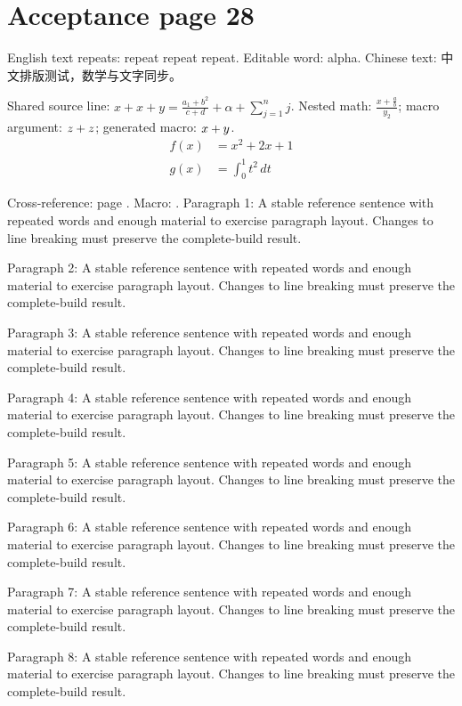 \section*{Acceptance page 28}
\label{page:28}
English text repeats: repeat repeat repeat. Editable word: alpha.
Chinese text: 中文排版测试，数学与文字同步。\par
Shared source line: $x+x+y=\frac{a_{1}+b^{2}}{c+d}+\alpha+\sum_{j=1}^{n}j$.
Nested math: $\frac{x+\frac{a}{b}}{y_{2}}$; macro argument: $z+z$; generated macro: $x+y$.
\begin{align*}
 f(x)&=x^{2}+2x+1\\
 g(x)&=\int_{0}^{1} t^{2}\,dt
\end{align*}
\par Cross-reference: page \pageref{page:1}. Macro: \globalword.
Paragraph 1: A stable reference sentence with repeated words and enough material to exercise paragraph layout. Changes to line breaking must preserve the complete-build result.\par
Paragraph 2: A stable reference sentence with repeated words and enough material to exercise paragraph layout. Changes to line breaking must preserve the complete-build result.\par
Paragraph 3: A stable reference sentence with repeated words and enough material to exercise paragraph layout. Changes to line breaking must preserve the complete-build result.\par
Paragraph 4: A stable reference sentence with repeated words and enough material to exercise paragraph layout. Changes to line breaking must preserve the complete-build result.\par
Paragraph 5: A stable reference sentence with repeated words and enough material to exercise paragraph layout. Changes to line breaking must preserve the complete-build result.\par
Paragraph 6: A stable reference sentence with repeated words and enough material to exercise paragraph layout. Changes to line breaking must preserve the complete-build result.\par
Paragraph 7: A stable reference sentence with repeated words and enough material to exercise paragraph layout. Changes to line breaking must preserve the complete-build result.\par
Paragraph 8: A stable reference sentence with repeated words and enough material to exercise paragraph layout. Changes to line breaking must preserve the complete-build result.\par
\newpage

